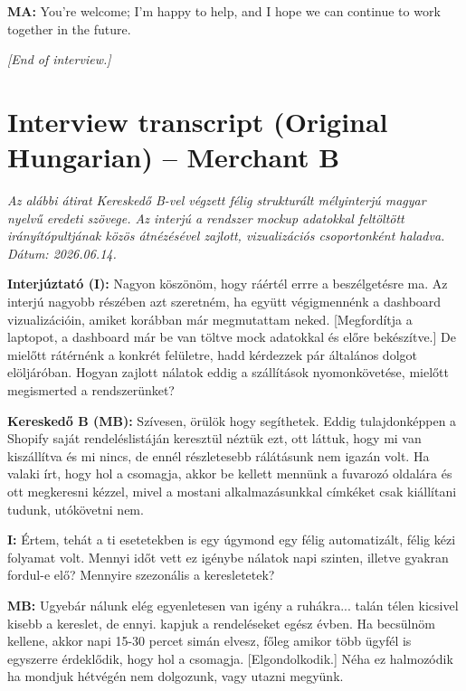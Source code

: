 \documentclass{imc-inf}
\begin{document}
\begin{appendices}
  \noindent\textbf{MA:} You're welcome; I'm happy to help, and I hope we can continue to work together in the future.

  \bigskip
  \noindent\textit{[End of interview.]}


  \chapter{Interview transcript (Original Hungarian) -- Merchant B}
  \label{app:interview-merchant-b}

  \noindent\textit{Az alábbi átirat Kereskedő B-vel végzett félig strukturált mélyinterjú magyar nyelvű eredeti szövege. Az interjú a rendszer mockup adatokkal feltöltött irányítópultjának közös átnézésével zajlott, vizualizációs csoportonként haladva. Dátum: 2026.06.14.}

  \bigskip
  \noindent\textbf{Interjúztató (I):} Nagyon köszönöm, hogy ráértél errre a beszélgetésre ma. Az interjú nagyobb részében azt szeretném, ha együtt végigmennénk a dashboard vizualizációin, amiket korábban már megmutattam neked. [Megfordítja a laptopot, a dashboard már be van töltve mock adatokkal és előre bekészítve.] De mielőtt rátérnénk a konkrét felületre, hadd kérdezzek pár általános dolgot elöljáróban. Hogyan zajlott nálatok eddig a szállítások nyomonkövetése, mielőtt megismerted a rendszerünket?

  \noindent\textbf{Kereskedő B (MB):} Szívesen, örülök hogy segíthetek. Eddig tulajdonképpen a Shopify saját rendeléslistáján keresztül néztük ezt, ott láttuk, hogy mi van kiszállítva és mi nincs, de ennél részletesebb rálátásunk nem igazán volt. Ha valaki írt, hogy hol a csomagja, akkor be kellett mennünk a fuvarozó oldalára és ott megkeresni kézzel, mivel a mostani alkalmazásunkkal címkéket csak kiállítani tudunk, utókövetni nem.

  \noindent\textbf{I:} Értem, tehát a ti esetetekben is egy úgymond egy félig automatizált, félig kézi folyamat volt. Mennyi időt vett ez igénybe nálatok napi szinten, illetve gyakran fordul-e elő? Mennyire szezonális a keresletetek?

  \noindent\textbf{MB:} Ugyebár nálunk elég egyenletesen van igény a ruhákra... talán télen kicsivel kisebb a kereslet, de ennyi. kapjuk a rendeléseket egész évben. Ha becsülnöm kellene, akkor napi 15-30 percet simán elvesz, főleg amikor több ügyfél is egyszerre érdeklődik, hogy hol a csomagja. [Elgondolkodik.] Néha ez halmozódik ha mondjuk hétvégén nem dolgozunk, vagy utazni megyünk.


\end{appendices}
\end{document}
